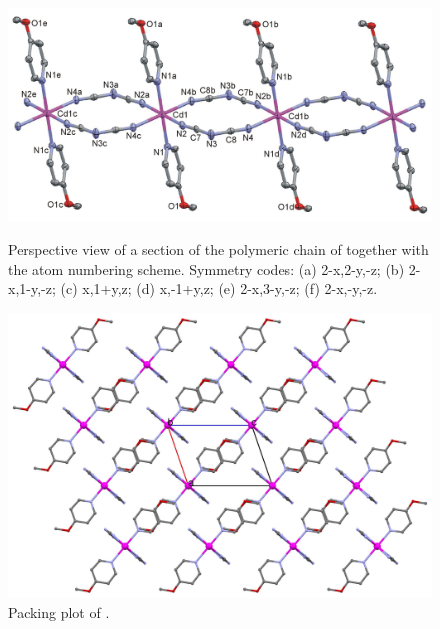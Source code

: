 \begin{figure}[!htpb]
\centering
\includegraphics[width=1\textwidth]{figures/cddca4mop_FIGm11.png}
\caption[Perspective view of ]{Perspective view of a section of the polymeric chain of   together with the atom numbering scheme. Symmetry codes: (a) 2-x,2-y,-z; (b) 2-x,1-y,-z; (c) x,1+y,z; (d) x,-1+y,z; (e) 2-x,3-y,-z; (f) 2-x,-y,-z.}
\label{fig:CdD4MOP_pv}
\vspace{\floatsep}
\includegraphics[width=1\textwidth]{figures/cddca4mop_CB.png}
\caption{Packing plot of .}
\label{fig:CdD4MOP_packv}
\end{figure}




